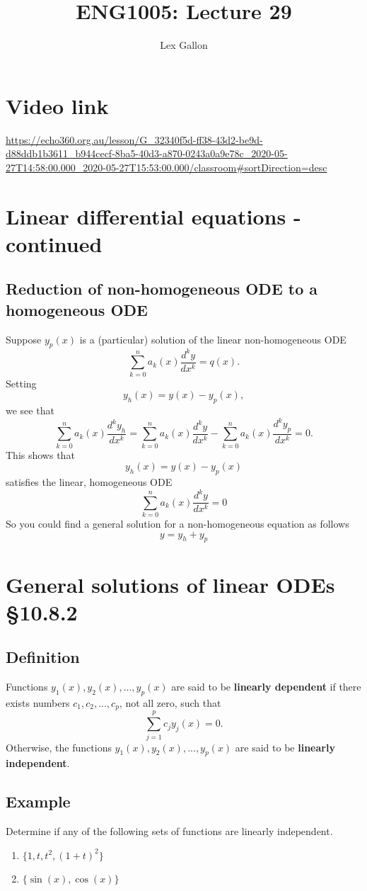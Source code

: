 \documentclass[11pt]{article}
\begin{document}
\title{ENG1005: Lecture 29}
\author{Lex Gallon}
\maketitle

\tableofcontents

\section*{Video link}
\url{https://echo360.org.au/lesson/G_32340f5d-ff38-43d2-be9d-d88ddb1b3611_b944cecf-8ba5-40d3-a870-0243a0a9e78c_2020-05-27T14:58:00.000_2020-05-27T15:53:00.000/classroom#sortDirection=desc}

\section{Linear differential equations - continued}
\subsection{Reduction of non-homogeneous ODE to a homogeneous ODE}
Suppose $y_p(x)$ is a (particular) solution of the linear non-homogeneous ODE
\[ \sum_{k=0}^n a_k(x) \frac{d^k y}{dx^k} = q(x). \]
Setting
\[ y_h(x) = y(x) - y_p(x), \]
we see that
\[ \sum_{k=0}^n a_k(x) \frac{d^k y_h}{d x^k} = \sum_{k=0}^n a_k(x) \frac{d^k y}{d x^k} - \sum_{k=0}^n a_k(x) \frac{d^k y_p}{d x^k} = 0. \]
This shows that
\[ y_h(x) = y(x) - y_p(x) \]
satisfies the linear, homogeneous ODE
\[ \sum_{k=0}^n a_k(x) \frac{d^k y}{dx^k} = 0 \]
So you could find a general solution for a non-homogeneous equation as follows
\[ y = y_h + y_p \]

\section{General solutions of linear ODEs §10.8.2}
\subsection{Definition}
Functions $y_1(x), y_2(x), ..., y_p(x)$ are said to be \textbf{linearly dependent} if there exists numbers $c_1, c_2, ..., c_p$, not all zero, such that
\[ \sum_{j=1}^p c_j y_j(x) = 0. \]
Otherwise, the functions $y_1(x), y_2(x), ..., y_p(x)$ are said to be \textbf{linearly independent}.

\subsection{Example}
Determine if any of the following sets of functions are linearly independent.
\begin{enumerate}[ (i) ]
\item $\{ 1, t, t^2, (1+t)^2 \}$
\item $\{ \sin(x), \cos(x) \}$
\end{enumerate}
\end{document}
